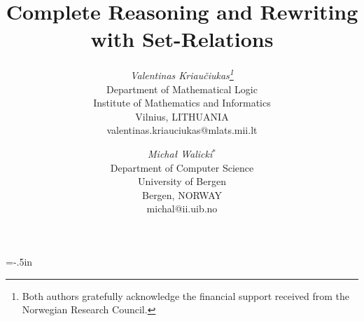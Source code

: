 \voffset=-.5in



\title{Complete Reasoning and Rewriting with Set-Relations}

\author{ {\it Valentinas Kriau\v ciukas\thanks{Both authors gratefully 
acknowledge the financial support received from the Norwegian Research Council.}}\\[-.5ex]
\small Department of Mathematical Logic\\[-.5ex]
\small Institute of Mathematics and Informatics\\[-.5ex]
\small Vilnius, LITHUANIA\\[-.5ex]
\footnotesize valentinas.kriauciukas@mlats.mii.lt 
\and 
{\it Micha{\l} Walicki\/\(^\ast\)}\\[-.5ex]
\small Department of Computer Science\\[-.5ex]
\small University of Bergen\\[-.5ex]
\small Bergen, NORWAY\\[-.5ex]
\footnotesize michal@ii.uib.no}




